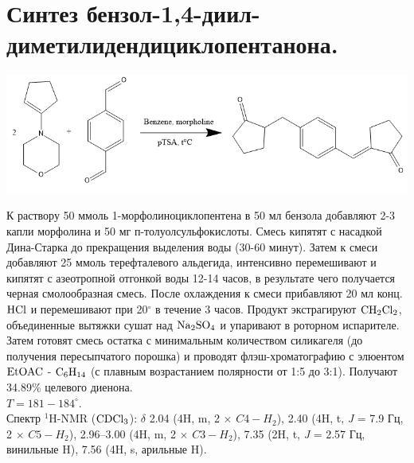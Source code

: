 \documentclass[a4paper]{article}
\begin{document}
\section{Синтез бензол-1,4-диил-диметилидендициклопентанона.}
\begin{center}
\includegraphics[scale=0.45]{pictures/4.png}
\end{center}
К раствору 50 ммоль 1-морфолиноциклопентена в 50 мл бензола добавляют 2-3 капли морфолина и 50 мг п-толуолсульфокислоты. Смесь кипятят с насадкой Дина-Старка до прекращения выделения воды (30-60 минут). Затем к смеси добавляют 25 ммоль терефталевого альдегида, интенсивно перемешивают и кипятят с азеотропной отгонкой воды 12-14 часов, в результате чего получается черная смолообразная смесь. После охлаждения к смеси прибавляют 20 мл конц. $\ce{HCl}$ и перемешивают при 20$^{\circ}$ в течение 3 часов. Продукт экстрагируют $\ce{CH2Cl2}$, объединенные вытяжки сушат над $\ce{Na2SO4}$ и упаривают в роторном испарителе. Затем готовят смесь остатка с минимальным количеством силикагеля (до получения пересыпчатого порошка) и проводят флэш-хроматографию с элюентом $\ce{EtOAC}$ - $\ce{C6H14}$ (с плавным возрастанием полярности от 1:5 до 3:1). Получают 34.89$\%$ целевого диенона. \\ $T = 181-184^{\circ}$. \\
Спектр $^{1}$H-NMR ($\ce{CDCl3}$):  $\delta$ 2.04 (4H, m, 2 $\times$ $C4-H_{2}$), 2.40 (4H, t, \textit{J} = 7.9 Гц, 2 $\times$ $C5-H_{2}$), 2.96--3.00 (4H, m, 2 $\times$ $C3-H_{2}$), 7.35 (2H, t, \textit{J} = 2.57 Гц, винильные H), 7.56 (4H, s, арильные H).
\end{document}
